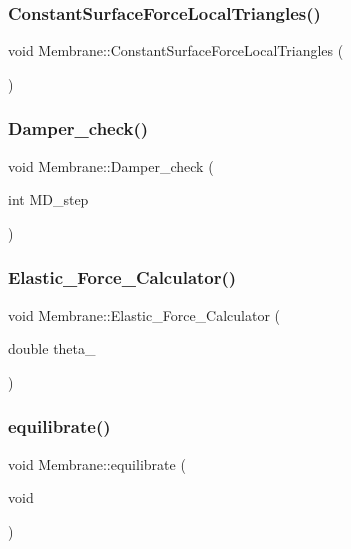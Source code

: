 \subsubsection{\texorpdfstring{ConstantSurfaceForceLocalTriangles()}{ConstantSurfaceForceLocalTriangles()}}
{\footnotesize\ttfamily void Membrane\+::\+Constant\+Surface\+Force\+Local\+Triangles (\begin{DoxyParamCaption}{ }\end{DoxyParamCaption})}

\mbox{\label{classMembrane_a86a920d04b19c6df2888c339c4f8cbc6}} 
\subsubsection{\texorpdfstring{Damper\_check()}{Damper\_check()}}
{\footnotesize\ttfamily void Membrane\+::\+Damper\+\_\+check (\begin{DoxyParamCaption}\item[{int}]{M\+D\+\_\+step }\end{DoxyParamCaption})}

\mbox{\label{classMembrane_aff8b24e17a5e51e8e00f1c1780694d1f}} 
\subsubsection{\texorpdfstring{Elastic\_Force\_Calculator()}{Elastic\_Force\_Calculator()}}
{\footnotesize\ttfamily void Membrane\+::\+Elastic\+\_\+\+Force\+\_\+\+Calculator (\begin{DoxyParamCaption}\item[{double}]{theta\+\_ }\end{DoxyParamCaption})}

\mbox{\label{classMembrane_a3c8f8e0f98162bab1d769b73498ba8c4}} 
\subsubsection{\texorpdfstring{equilibrate()}{equilibrate()}}
{\footnotesize\ttfamily void Membrane\+::equilibrate (\begin{DoxyParamCaption}\item[{void}]{ }\end{DoxyParamCaption})}

